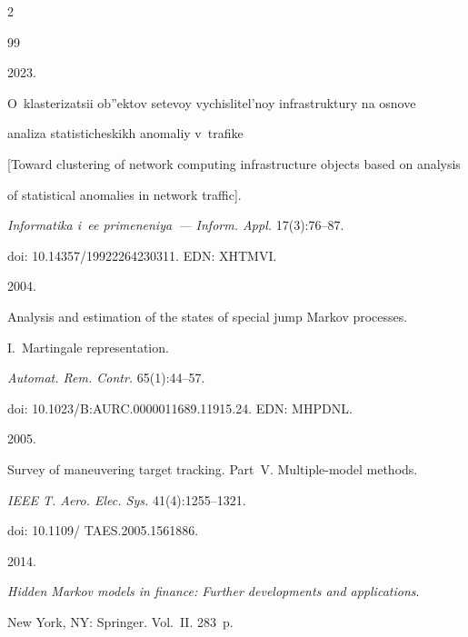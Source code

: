 \begin{multicols}{2}
{{\begin{thebibliography}{99}




 2023.


O~klasterizatsii ob''ektov setevoy vychislitel'noy inf\-ra\-struk\-tu\-ry na osnove 


analiza statisticheskikh anomaliy v~trafike 


[Toward clustering of network computing infrastructure objects based on analysis 


of statistical anomalies in network traffic]. 


\textit{Informatika i~ee primeneniya~--- Inform. Appl.} 17(3):76--87. 


doi: 10.14357/19922264230311. EDN: XHTMVI.









 2004.


Analysis and estimation of the states of special jump Markov processes. 


I.~Martingale representation.


\textit{Automat. Rem. Contr.} 65(1):44--57.  


doi: 10.1023/B:AURC.0000011689.11915.24. EDN: MHPDNL.












 2005. 


Survey of maneuvering target tracking. Part~V. Multiple-model methods. 


\textit{IEEE T. Aero. Elec. Sys.} 41(4):1255--1321.


doi: 10.1109/ TAES.2005.1561886.









 2014. 


\textit{Hidden Markov models in finance: Further developments and applications}. 


New York, NY: Springer. Vol.~II. 283~p.






\end{thebibliography}}}
\end{multicols}

